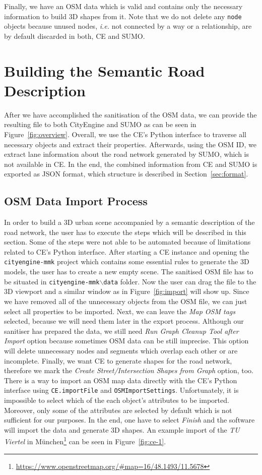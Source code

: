 Finally, we have an OSM data which is valid and contains only the necessary information to build 3D shapes from it. Note that we do not delete any \texttt{node} objects because unused nodes, \emph{i.e.} not connected by a way or a relationship, are by default discarded in both, CE and SUMO.

\section{Building the Semantic Road Description}
After we have accomplished the sanitisation of the OSM data, we can provide the resulting file to both CityEngine and SUMO as can be seen in Figure~\ref{fig:overview}. Overall, we use the CE's Python interface to traverse all necessary objects and extract their properties. Afterwards, using the OSM ID, we extract lane information about the road network generated by SUMO, which is not available in CE. In the end, the combined information from CE and SUMO is exported as JSON format, which structure is described in Section~\ref{sec:format}. 

\subsection{OSM Data Import Process}
In order to build a 3D urban scene accompanied by a semantic description of the road network, the user has to execute the steps which will be described in this section. Some of the steps were not able to be automated because of limitations related to CE's Python interface. After starting a CE instance and opening the \texttt{cityengine-mmk} project which contains some essential rules to generate the 3D models, the user has to create a new empty scene. The sanitised OSM file has to be situated in \texttt{cityengine-mmk$\backslash$data} folder. Now the user can drag the file to the 3D viewport and a similar window as in Figure~\ref{fig:import} will show up. Since we have removed all of the unnecessary objects from the OSM file, we can just select all properties to be imported. Next, we can leave the \emph{Map OSM tags} selected, because we will need them later in the export process. Although our sanitiser has prepared the data, we still need \emph{Run Graph Cleanup Tool after Import} option because sometimes OSM data can be still imprecise. This option will delete unnecessary nodes and segments which overlap each other or are incomplete. Finally, we want CE to generate shapes for the road network, therefore we mark the \emph{Create Street/Intersection Shapes from Graph} option, too. There is a way to import an OSM map data directly with the CE's Python interface using \texttt{CE.importFile} and \texttt{OSMImportSettings}. Unfortunately, it is impossible to select which of the each object's attributes to be imported. Moreover, only some of the attributes are selected by default which is not sufficient for our purposes. In the end, one have to select \emph{Finish} and the software will import the data and generate 3D shapes. An example import of the \emph{TU Viertel} in M\"unchen\footnote{\url{https://www.openstreetmap.org/#map=16/48.1493/11.5678}} can be seen in Figure~\ref{fig:ce-1}.

